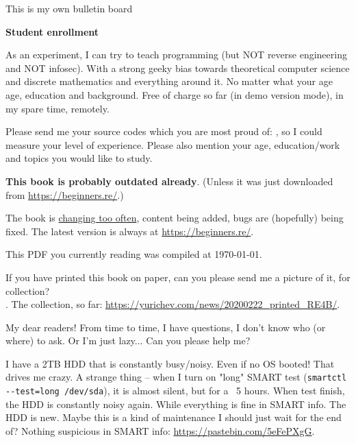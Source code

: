 
\begin{center}
\LARGE{} This is my own bulletin board \normalsize{}
\end{center}

\textbf{Student enrollment}

As an experiment, I can try to teach programming (but NOT reverse engineering and NOT infosec). With a strong geeky bias towards theoretical computer science and discrete mathematics and everything around it. No matter what your age age, education and background. Free of charge so far (in demo version mode), in my spare time, remotely.

Please send me your source codes which you are most proud of: \EMAILS{},
so I could measure your level of experience. Please also mention your age, education/work and topics you would like to study.

\myhrule{}

\textbf{This book is probably outdated already}.
(Unless it was just downloaded from \url{https://beginners.re/}.)

The book is \href{\RepoURL/ChangeLog}{changing too often},
content being added, bugs are (hopefully) being fixed.
The latest version is always at \url{https://beginners.re/}.

This PDF you currently reading was compiled at \today{}.

\myhrule{}

If you have printed this book on paper, can you please send me a picture of it, for collection?\\
\EMAILS{}.
The collection, so far: \url{https://yurichev.com/news/20200222_printed_RE4B/}.

\myhrule{}

My dear readers! From time to time, I have questions, I don't know who (or where) to ask.
Or I'm just lazy...
Can you please help me?

\myhrule{}

I have a 2TB HDD that is constantly busy/noisy.
Even if no OS booted!
That drives me crazy.
A strange thing -- when I turn on "long" SMART test (\verb|smartctl --test=long /dev/sda|),
it is almost silent, but for a ~5 hours.
When test finish, the HDD is constantly noisy again.
While everything is fine in SMART info.
The HDD is new.
Maybe this is a kind of maintenance I should just wait for the end of?
Nothing suspicious in SMART info: \url{https://pastebin.com/5eFePXgG}.

